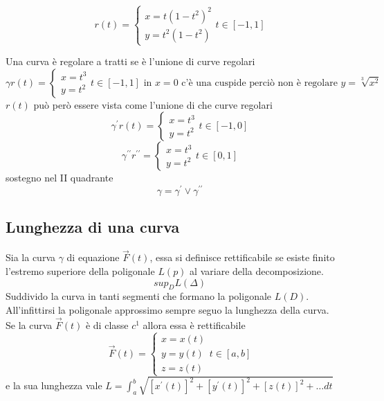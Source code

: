 \begin{defi}
\begin{multicols}{2}
\begin{equation*}
			r(t)=\begin{cases}
				x=t(1-t^2)^2\\
				y=t^2(1-t^2)
			\end{cases} t\in[-1,1]
		\end{equation*}
	\end{multicols}
	Una curva è {\color{red}regolare a tratti} se è l'unione di curve regolari
	\begin{equation*}
		\gamma r(t)=\begin{cases}
			x=t^3\\
			y=t^2
		\end{cases} t\in[-1,1] \text{ in $x=0$ c'è una cuspide perciò non è regolare $y=\sqrt[3]{x^2}$}
	\end{equation*}
	$r(t)$ può però essere vista come l'unione di che curve regolari
	\begin{equation*}
		\gamma^\prime r (t)=\begin{cases}
			x=t^3\\
			y=t^2
		\end{cases} t\in [-1,0]
	\end{equation*}
	\begin{equation*}
		\gamma^{\prime\prime} r^{\prime\prime}=\begin{cases}
			x=t^3\\
			y=t^2
		\end{cases} t\in [0,1]
	\end{equation*}
	sostegno nel II quadrante
	\begin{equation*}
		\gamma=\gamma^\prime \vee \gamma^{\prime\prime}
	\end{equation*}
\end{defi}
\subsection{Lunghezza di una curva}
\begin{defi}
	Sia la curva $\gamma$ di equazione $\vec{F}(t)$, essa si definisce
	{\color{red}rettificabile} se esiste finito l'estremo superiore della
	poligonale $L(p)$ al variare della decomposizione.
	\begin{equation}
		sup_DL(\Delta)
	\end{equation}
	Suddivido la curva in tanti segmenti che formano la poligonale $L(D)$.
	All'infittirsi la poligonale approssimo sempre seguo la lunghezza della
	curva.\\
	Se la curva $\vec{F}(t)$ è di classe $c^1$ allora essa è
	{\color{red}rettificabile}
	\begin{equation}
		\vec{F}(t)=\begin{cases}
			x=x(t)\\
			y=y(t)\\
			z=z(t)
		\end{cases} t\in [a,b]
	\end{equation}
	e la sua lunghezza vale
	$L=\int_{a}^{b}\sqrt{[x^\prime(t)]^2+[y^\prime(t)]^2 + [z(t)]^2+\dots dt}$
\end{defi}
